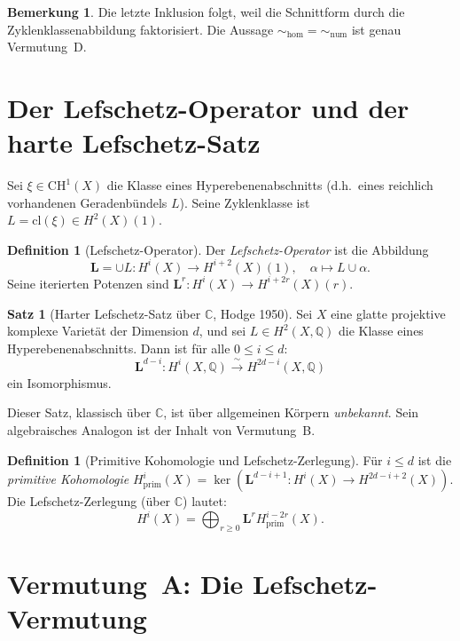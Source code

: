 \documentclass[12pt,a4paper]{amsart}
\theoremstyle{definition}
\newtheorem{satz}[theorem]{Satz}
\newtheorem{bemerkung}[theorem]{Bemerkung}
\newtheorem{definition_de}[theorem]{Definition}
\newcommand{\Q}{\mathbb{Q}}
\newcommand{\C}{\mathbb{C}}
\newcommand{\CH}{\mathrm{CH}}
\newcommand{\cl}{\mathrm{cl}}
\begin{document}
\begin{bemerkung}
Die letzte Inklusion folgt, weil die Schnittform durch die Zyklenklassenabbildung
faktorisiert.  Die Aussage ${\sim_{\mathrm{hom}}} = {\sim_{\mathrm{num}}}$
ist genau Vermutung~D.
\end{bemerkung}

\section{Der Lefschetz-Operator und der harte Lefschetz-Satz}\label{sec:lefschetz}

Sei $\xi \in \CH^1(X)$ die Klasse eines Hyperebenenabschnitts (d.h.\ eines
reichlich vorhandenen Geradenbündels $L$).  Seine Zyklenklasse ist
$L = \cl(\xi) \in H^2(X)(1)$.

\begin{definition_de}[Lefschetz-Operator]
Der \emph{Lefschetz-Operator} ist die Abbildung
\[
  \mathbf{L} = \cup L : H^i(X) \longrightarrow H^{i+2}(X)(1),
  \quad \alpha \mapsto L \cup \alpha.
\]
Seine iterierten Potenzen sind $\mathbf{L}^r : H^i(X) \to H^{i+2r}(X)(r)$.
\end{definition_de}

\begin{satz}[Harter Lefschetz-Satz über $\mathbb{C}$, Hodge 1950]
Sei $X$ eine glatte projektive komplexe Varietät der Dimension $d$, und
sei $L \in H^2(X,\Q)$ die Klasse eines Hyperebenenabschnitts.
Dann ist für alle $0 \leq i \leq d$:
\[
  \mathbf{L}^{d-i} : H^i(X,\Q) \xrightarrow{\;\sim\;} H^{2d-i}(X,\Q)
\]
ein Isomorphismus.
\end{satz}

Dieser Satz, klassisch über $\C$, ist über allgemeinen Körpern
\emph{unbekannt}.  Sein algebraisches Analogon ist der Inhalt von Vermutung~B.

\begin{definition_de}[Primitive Kohomologie und Lefschetz-Zerlegung]
Für $i \leq d$ ist die \emph{primitive Kohomologie}
$H^i_{\mathrm{prim}}(X) = \ker(\mathbf{L}^{d-i+1}: H^i(X) \to H^{2d-i+2}(X))$.
Die Lefschetz-Zerlegung (über $\C$) lautet:
\[
  H^i(X) = \bigoplus_{r \geq 0} \mathbf{L}^r H^{i-2r}_{\mathrm{prim}}(X).
\]
\end{definition_de}

\section{Vermutung~A: Die Lefschetz-Vermutung}\label{sec:vermutungA}
\end{document}
